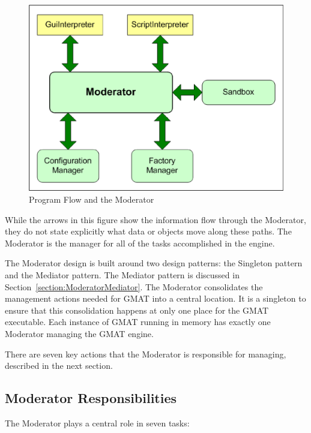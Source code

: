 \begin{figure}[htb]
\begin{center}
\includegraphics[scale=0.5]{Images/ModeratorInteractions.eps}
\caption{Program Flow and the Moderator}
\label{figure:ModeratorInteractions}
\end{center}
\end{figure}

While the arrows in this figure show the information flow through the Moderator, they do not state
explicitly what data or objects move along these paths.  The Moderator is the manager for all of
the tasks accomplished in the engine.

The Moderator design is built around two design patterns: the Singleton pattern and the Mediator
pattern.  The Mediator pattern is discussed in Section~\ref{section:ModeratorMediator}.  The
Moderator consolidates the management actions needed for GMAT into a central location.  It is a
singleton to ensure that this consolidation happens at only one place for the GMAT executable.  Each
instance of GMAT running in memory has exactly one Moderator managing the GMAT engine.

There are seven key actions that the Moderator is responsible for managing, described in the next
section.

\subsection{Moderator Responsibilities}

The Moderator plays a central role in seven tasks:

